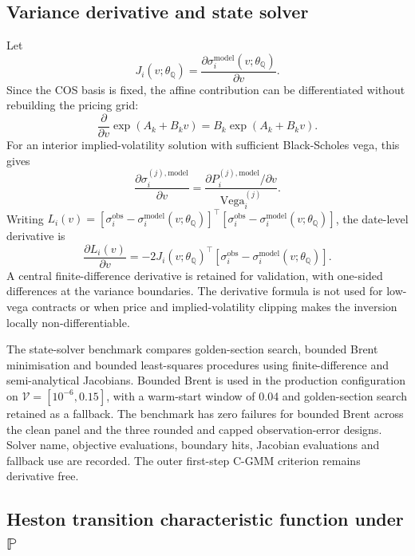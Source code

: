 \documentclass[11pt,a4paper,notitlepage]{article}
\numberwithin{equation}{section}
\begin{document}
\subsection{Variance derivative and state solver}

Let
\[
J_i(v;\theta_{\mathbb Q})
=
\frac{\partial\sigma_i^{\mathrm{model}}(v;\theta_{\mathbb Q})}{\partial v}.
\]
Since the COS basis is fixed, the affine contribution can be differentiated without rebuilding the pricing grid:
\begin{equation}
\frac{\partial}{\partial v}\exp(A_k+B_kv)
=
B_k\exp(A_k+B_kv).
\label{eq:app_cos_variance_derivative}
\end{equation}
For an interior implied-volatility solution with sufficient Black-Scholes vega, this gives
\begin{equation}
\frac{\partial\sigma_i^{(j),\mathrm{model}}}{\partial v}
=
\frac{\partial P_i^{(j),\mathrm{model}}/\partial v}
{\operatorname{Vega}_i^{(j)}}.
\label{eq:app_iv_variance_derivative}
\end{equation}
Writing \(L_i(v)=[\sigma_i^{\mathrm{obs}}-\sigma_i^{\mathrm{model}}(v;\theta_{\mathbb Q})]^\top[\sigma_i^{\mathrm{obs}}-\sigma_i^{\mathrm{model}}(v;\theta_{\mathbb Q})]\), the date-level derivative is
\begin{equation}
\frac{\partial L_i(v)}{\partial v}
=
-2J_i(v;\theta_{\mathbb Q})^\top
\left[\sigma_i^{\mathrm{obs}}-\sigma_i^{\mathrm{model}}(v;\theta_{\mathbb Q})\right].
\label{eq:app_state_loss_derivative}
\end{equation}
A central finite-difference derivative is retained for validation, with one-sided differences at the variance boundaries. The derivative formula is not used for low-vega contracts or when price and implied-volatility clipping makes the inversion locally non-differentiable.

The state-solver benchmark compares golden-section search, bounded Brent minimisation and bounded least-squares procedures using finite-difference and semi-analytical Jacobians. Bounded Brent is used in the production configuration on \(\mathcal V=[10^{-6},0.15]\), with a warm-start window of 0.04 and golden-section search retained as a fallback. The benchmark has zero failures for bounded Brent across the clean panel and the three rounded and capped observation-error designs. Solver name, objective evaluations, boundary hits, Jacobian evaluations and fallback use are recorded. The outer first-step C-GMM criterion remains derivative free.

\subsection{Heston transition characteristic function under \(\mathbb P\)}
\end{document}
